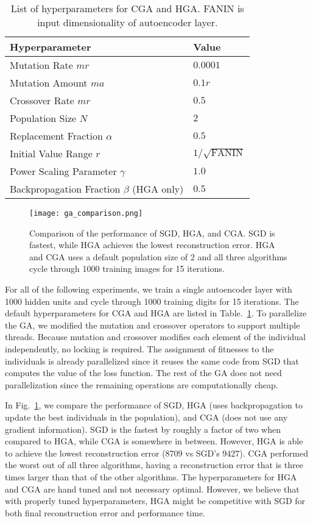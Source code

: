 \begin{table}[h]
  \centering
\begin{tabular}{l|l}
Hyperparameter     & Value                                                          \\ \hline
Mutation Rate $mr$ & $0.0001$ \\
Mutation Amount $ma$ & $0.1r$ \\
Crossover Rate $mr$ & $0.5$ \\
Population Size $N$ & $2$ \\
Replacement Fraction $\alpha$ & $0.5$ \\
Initial Value Range $r$ & $1/\sqrt{\text{FANIN}}$ \\
Power Scaling Parameter $\gamma$ & $1.0$ \\
Backpropagation Fraction $\beta$ (HGA only) & $0.5$ \\ 

\end{tabular}
\caption{List of hyperparameters for CGA and HGA. FANIN is input dimensionality of autoencoder layer.}
\label{tab:hyperparameters}
\end{table}

\begin{figure}[h] \centering
  \texttt{[image: ga\_comparison.png]}
  \caption{Comparison of the performance of SGD, HGA, and CGA. SGD is fastest, while HGA achieves the lowest reconstruction error. HGA and CGA uses a default population size of 2 and all three algorithms cycle through 1000 training images for 15 iterations.}
  \label{fig:ga_comparison}
\end{figure}

For all of the following experiments, we train a single autoencoder layer with 1000 hidden units and cycle through 1000 training digits for 15 iterations. The default hyperparameters for CGA and HGA are listed in Table.~\ref{tab:hyperparameters}. To parallelize the GA, we modified the mutation and crossover operators to support multiple threads. Because mutation and crossover modifies each element of the individual independently, no locking is required. The assignment of fitnesses to the individuals is already parallelized since it reuses the same code from SGD that computes the value of the loss function. The rest of the GA does not need parallelization since the remaining operations are computationally cheap. 

In Fig.~\ref{fig:ga_comparison}, we compare the performance of SGD, HGA (uses backpropagation to update the best individuals in the population), and CGA (does not use any gradient information). SGD is the fastest by roughly a factor of two when compared to HGA, while CGA is somewhere in between. However, HGA is able to achieve the lowest reconstruction error (8709 vs SGD's 9427). CGA performed the worst out of all three algorithms, having a reconstruction error that is three times larger than that of the other algorithms. The hyperparameters for HGA and CGA are hand tuned and not necessary optimal. However, we believe that with properly tuned hyperparameters, HGA might be competitive with SGD for both final reconstruction error and performance time. 

